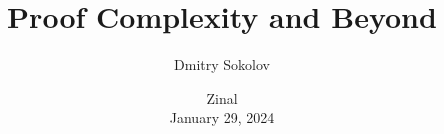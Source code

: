 

\titlegraphic{
    
}


\title[Proof Complexity]{
    Proof Complexity and Beyond
}

\author{
    Dmitry Sokolov
}  


\date{Zinal\\ January 29, 2024}

\newcommand{\SPCR}{\PrSys{S}\text{-}\PrSys{PCR}}
\newcommand{\SSOS}{\PrSys{S}\text{-}\PrSys{SOS}}




    \maketitle

    
    
    
    
    
    

